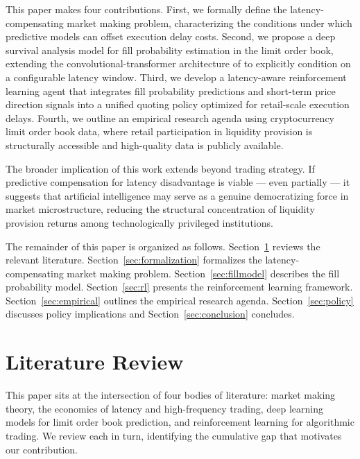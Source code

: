 \documentclass[12pt]{article}
\begin{document}
This paper makes four contributions. First, we formally define the latency-compensating market making problem, characterizing the conditions under which predictive models can offset execution delay costs. Second, we propose a deep survival analysis model for fill probability estimation in the limit order book, extending the convolutional-transformer architecture of \citet{arroyo2024} to explicitly condition on a configurable latency window. Third, we develop a latency-aware reinforcement learning agent that integrates fill probability predictions and short-term price direction signals into a unified quoting policy optimized for retail-scale execution delays. Fourth, we outline an empirical research agenda using cryptocurrency limit order book data, where retail participation in liquidity provision is structurally accessible and high-quality data is publicly available.

The broader implication of this work extends beyond trading strategy. If predictive compensation for latency disadvantage is viable --- even partially --- it suggests that artificial intelligence may serve as a genuine democratizing force in market microstructure, reducing the structural concentration of liquidity provision returns among technologically privileged institutions.

The remainder of this paper is organized as follows. Section~\ref{sec:lit} reviews the relevant literature. Section~\ref{sec:formalization} formalizes the latency-compensating market making problem. Section~\ref{sec:fillmodel} describes the fill probability model. Section~\ref{sec:rl} presents the reinforcement learning framework. Section~\ref{sec:empirical} outlines the empirical research agenda. Section~\ref{sec:policy} discusses policy implications and Section~\ref{sec:conclusion} concludes.

\section{Literature Review}
\label{sec:lit}

This paper sits at the intersection of four bodies of literature: market making theory, the economics of latency and high-frequency trading, deep learning models for limit order book prediction, and reinforcement learning for algorithmic trading. We review each in turn, identifying the cumulative gap that motivates our contribution.
\end{document}
